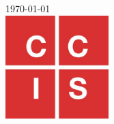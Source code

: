 \begin{titlepage}


{\large \today}\\[2cm] %


\includegraphics[width=4cm, height=4cm]{logo.jpg}\\[1cm] %
 


\end{titlepage}
% 







\newpage

\newpage




